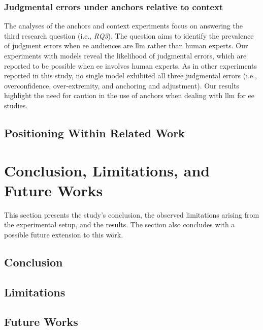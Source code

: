 \documentclass[manuscript,review,anonymous]{acmart}
\begin{document}
\subsubsection{Judgmental errors under anchors relative to context}
The analyses of the anchors and context experiments focus on answering the third research question (i.e., \textit{RQ3}). The question aims to identify the prevalence of judgment errors when \gls{ee} audiences are \gls{llm} rather than human experts. Our experiments with models reveal the likelihood of judgmental errors, which are reported to be possible when \gls{ee} involves human experts. As in other experiments reported in this study, no single model exhibited all three judgmental errors (i.e., overconfidence, over-extremity, and anchoring and adjustment). Our results highlight the need for caution in the use of anchors when dealing with \gls{llm} for \gls{ee} studies.

\subsection{Positioning Within Related Work}



\section{Conclusion, Limitations, and Future Works}
This section presents the study's conclusion, the observed limitations arising from the experimental setup, and the results. The section also concludes with a possible future extension to this work.

\subsection{Conclusion}



\subsection{Limitations}




\subsection{Future Works}
\end{document}

